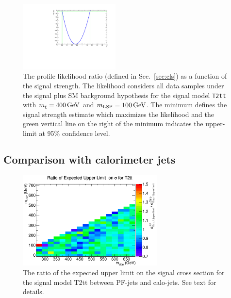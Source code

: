 \begin{figure}[h!]
  \begin{center}
      \includegraphics[width=0.45\textwidth]{figures/fit/v22/wSignal/400_100/intervalPlot_2012pf_RQcdZero_fZinvAll_1b_ge4j-1hp_2b_ge4j-1h_signal_95}
    \caption{\label{fig:t2tt-int-400_100}The profile likelihood ratio 
      (defined in Sec.~\ref{sec:cls}) as a function of the signal strength.
      The likelihood considers all data samples under the signal plus SM 
      background hypothesis for the signal model \texttt{T2tt} with 
      $m_{\tilde{\rm t}} = 400\,\text{Ge\hspace{-.08em}V}$ and $m_{\text{LSP}} = 100\,\text{Ge\hspace{-.08em}V}$.
      The minimum defines the signal strength estimate which maximizes the
      likelihood and the green vertical line on the right of the minimum 
      indicates the upper-limit at 95\% confidence level.}
  \end{center}
\end{figure}
\FloatBarrier

\subsection{Comparison with calorimeter jets}

\begin{figure}[h!]
  \begin{center}
      \includegraphics[width=0.65\textwidth]{figures/T2tt_ExpectedUpperLimit_ratio}
    \caption{\label{fig:pfVsCalo} The ratio of the expected upper limit on the signal
      cross section for the signal model T2tt between PF-jets and calo-jets. See text for 
      details.}
  \end{center}
\end{figure}

